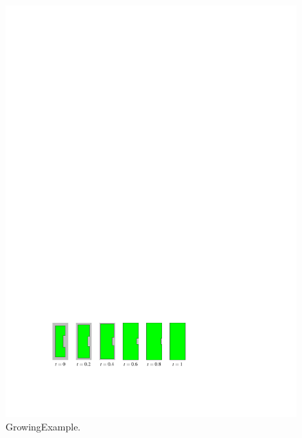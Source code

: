 \documentclass[graybox]{svmult}
\begin{document}
\begin{figure}[tb]
	\centering
	\includegraphics{GrowingExample}
	\caption{GrowingExample.}
	\label{fig:GrowingExample}
\end{figure}
\end{document}
